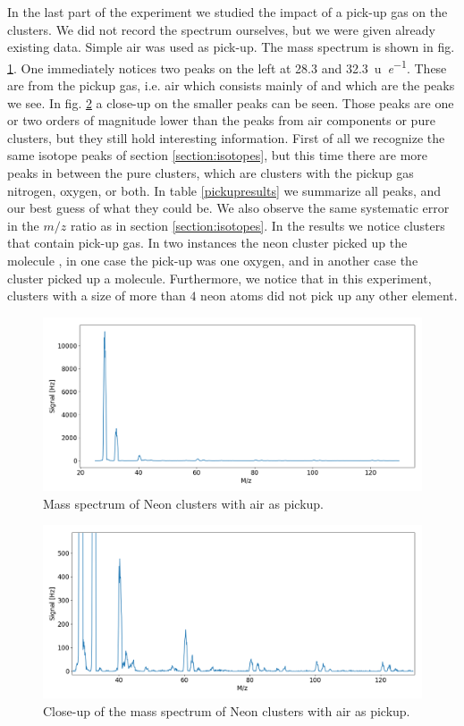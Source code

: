 \documentclass[a4paper,10pt]{article}
\begin{document}
 In the last part of the experiment we studied the impact of a pick-up gas on the clusters. We did not record the spectrum ourselves, but we were given already existing data. Simple air was used as pick-up. The mass spectrum is shown in fig. \ref{pickup}. One immediately notices two peaks on the left at 28.3 and \SI{32.3}{\atomicmassunit \per \elementarycharge}. These are from the pickup gas, i.e. air which consists mainly of  and  which are the peaks we see. In fig. \ref{pickupzoom} a close-up on the smaller peaks can be seen. Those peaks are one or two orders of magnitude lower than the peaks from air components or pure  clusters, but they still hold interesting information. First of all we recognize the same isotope peaks of section \ref{section:isotopes}, but this time there are more peaks in between the pure clusters, which are clusters with the pickup gas nitrogen, oxygen, or both. In table \ref{pickupresults} we summarize all peaks, and our best guess of what they could be. We also observe the same systematic error in the $m/z$ ratio as in section \ref{section:isotopes}.
In the results we notice clusters that contain pick-up gas. In two instances the neon cluster picked up the molecule , in one case the pick-up was one oxygen, and in another case the cluster picked up a  molecule.
 Furthermore, we notice that in this experiment, clusters with a size of more than $4$ neon atoms did not pick up any other element.

\begin{figure}[H]
	\centering
	\includegraphics[width =\textwidth]{pickup}
	\caption{Mass spectrum of Neon clusters with air as pickup.}
	\label{pickup}
\end{figure}
\begin{figure}[H]
	\centering
	\includegraphics[width =\textwidth]{pickupzoom}
	\caption{Close-up of the mass spectrum of Neon clusters with air as pickup.}
	\label{pickupzoom}
\end{figure}
\end{document}

